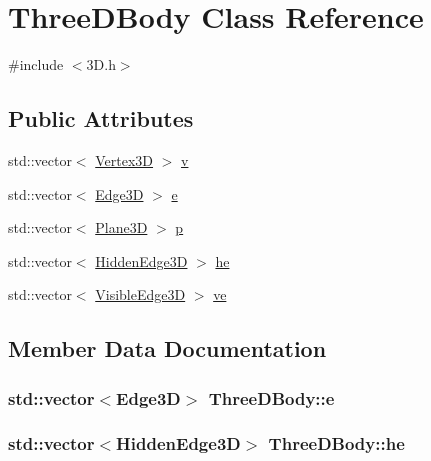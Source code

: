 \hypertarget{class_three_d_body}{}\section{Three\+D\+Body Class Reference}
\label{class_three_d_body}


{\ttfamily \#include $<$3\+D.\+h$>$}

\subsection*{Public Attributes}
\begin{DoxyCompactItemize}
\item 
std\+::vector$<$ \hyperlink{class_vertex3_d}{Vertex3D} $>$ \hyperlink{class_three_d_body_ae85a9587eced34b16806c2c2f009d208}{v}
\item 
std\+::vector$<$ \hyperlink{class_edge3_d}{Edge3D} $>$ \hyperlink{class_three_d_body_a20054d806b11e6d6ee768231a1ee61d3}{e}
\item 
std\+::vector$<$ \hyperlink{class_plane3_d}{Plane3D} $>$ \hyperlink{class_three_d_body_a871bc38d1590dfb2f076a8ca2def89ad}{p}
\item 
std\+::vector$<$ \hyperlink{class_hidden_edge3_d}{Hidden\+Edge3D} $>$ \hyperlink{class_three_d_body_a89940d00825338f6f685b7522be1d200}{he}
\item 
std\+::vector$<$ \hyperlink{class_visible_edge3_d}{Visible\+Edge3D} $>$ \hyperlink{class_three_d_body_ab35d0ee77c7176e3133a9d3357d173e2}{ve}
\end{DoxyCompactItemize}


\subsection{Member Data Documentation}
\subsubsection[{\texorpdfstring{e}{e}}]{\setlength{\rightskip}{0pt plus 5cm}std\+::vector$<${\bf Edge3D}$>$ Three\+D\+Body\+::e}\hypertarget{class_three_d_body_a20054d806b11e6d6ee768231a1ee61d3}{}\label{class_three_d_body_a20054d806b11e6d6ee768231a1ee61d3}
\subsubsection[{\texorpdfstring{he}{he}}]{\setlength{\rightskip}{0pt plus 5cm}std\+::vector$<${\bf Hidden\+Edge3D}$>$ Three\+D\+Body\+::he}\hypertarget{class_three_d_body_a89940d00825338f6f685b7522be1d200}{}\label{class_three_d_body_a89940d00825338f6f685b7522be1d200}
